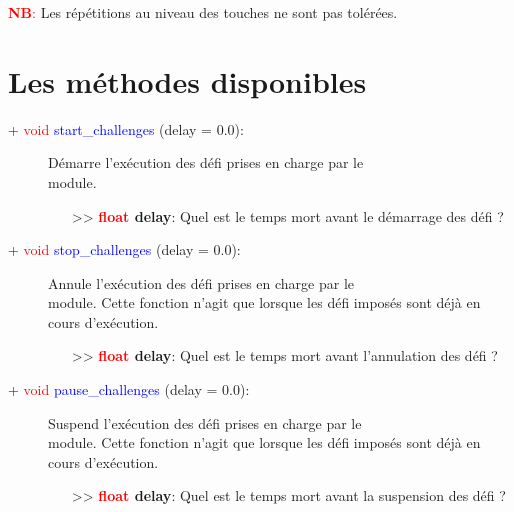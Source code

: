 \documentclass[a4paper, 11pt]{article}
\begin{document}
	\textcolor{red}{\textbf{NB}:} Les répétitions au niveau des touches ne sont pas tolérées.

	\section{Les méthodes disponibles}
	\begin{description}
		\item [+ \textcolor{red}{void} \textcolor{blue}{start\_challenges} (delay = 0.0):] Démarre 
		l'exécution des défi prises en charge par le \\module.
		\begin{itemize}
			\item [>> \textbf{\textcolor{red}{float} delay}:] Quel est le temps mort avant le démarrage des
			défi ?\\
		\end{itemize}
	\end{description}
	\begin{description}
		\item [+ \textcolor{red}{void} \textcolor{blue}{stop\_challenges} (delay = 0.0):] Annule l'exécution 
		des défi prises en charge par le \\module. Cette fonction n'agit que lorsque les défi imposés sont 
		déjà en cours d'exécution.
		\begin{itemize}
			\item [>> \textbf{\textcolor{red}{float} delay}:] Quel est le temps mort avant l'annulation des
			défi ?\\
		\end{itemize}
	\end{description}
	\begin{description}
		\item [+ \textcolor{red}{void} \textcolor{blue}{pause\_challenges} (delay = 0.0):] Suspend 
		l'exécution des défi prises en charge par le \\module. Cette fonction n'agit que lorsque les défi 
		imposés sont déjà en cours d'exécution.
		\begin{itemize}
			\item [>> \textbf{\textcolor{red}{float} delay}:] Quel est le temps mort avant la suspension des
			défi ?\\
		\end{itemize}
	\end{description}
\end{document}
